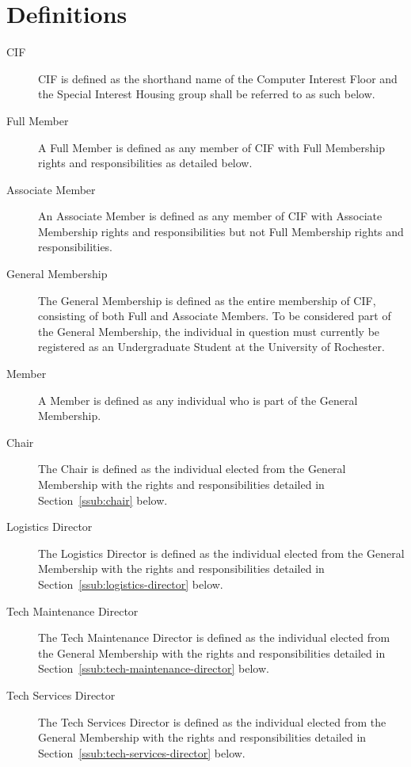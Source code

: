 \section{Definitions}
\label{sec:definitions}

\begin{description}
  \item[CIF] CIF is defined as the shorthand name of the Computer Interest Floor and the Special Interest Housing group shall be referred to as such below.

  \item[Full Member] A Full Member is defined as any member of CIF with Full Membership rights and responsibilities as detailed below.

  \item[Associate Member] An Associate Member is defined as any member of CIF with Associate Membership rights and responsibilities but not Full Membership rights and responsibilities.

  \item[General Membership] The General Membership is defined as the entire membership of CIF, consisting of both Full and Associate Members. To be considered part of the General Membership, the individual in question must currently be registered as an Undergraduate Student at the University of Rochester.

  \item[Member] A Member is defined as any individual who is part of the General Membership.

  \item[Chair] The Chair is defined as the individual elected from the General Membership with the rights and responsibilities detailed in Section~\ref{ssub:chair} below.

  \item[Logistics Director] The Logistics Director is defined as the individual elected from the General Membership with the rights and responsibilities detailed in Section~\ref{ssub:logistics-director} below.

  \item[Tech Maintenance Director] The Tech Maintenance Director is defined as the individual elected from the General Membership with the rights and responsibilities detailed in Section~\ref{ssub:tech-maintenance-director} below.

  \item[Tech Services Director] The Tech Services Director is defined as the individual elected from the General Membership with the rights and responsibilities detailed in Section~\ref{ssub:tech-services-director} below.


\end{description}
